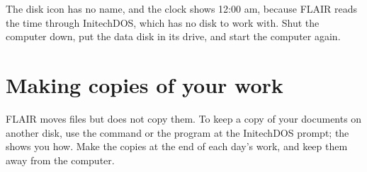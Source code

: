 The disk icon has no name, and the clock shows 12:00 am, because FLAIR
reads the time through InitechDOS, which has no disk to work with.  Shut the
computer down, put the data disk in its drive, and start the computer
again.

\section{Making copies of your work}
FLAIR moves files but does not copy them.  To keep a copy of your
documents on another disk, use the  command or the 
program at the InitechDOS prompt; the 
shows you how.  Make the copies at the end of each day's work, and keep
them away from the computer.
